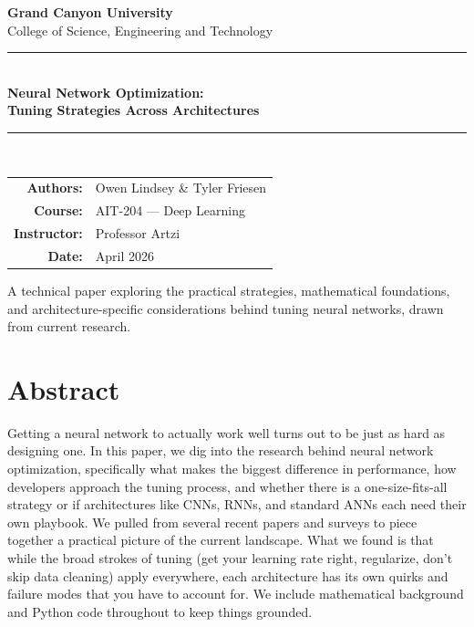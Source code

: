 \documentclass[12pt, letterpaper]{article}
\begin{document}
\begin{titlepage}
\centering
\vspace*{2cm}

{\Large\bfseries\color{gcupurple} Grand Canyon University}\\[4pt]
{\large College of Science, Engineering and Technology}\\[1cm]
\rule{\textwidth}{1.2pt}\\[1.4cm]

{\LARGE\bfseries Neural Network Optimization:\\[6pt]
Tuning Strategies Across Architectures}\\[1.4cm]

\rule{\textwidth}{1.2pt}\\[2cm]

{\large
\begin{tabular}{rl}
\textbf{Authors:} & Owen Lindsey \& Tyler Friesen \\[6pt]
\textbf{Course:} & AIT-204 --- Deep Learning \\[6pt]
\textbf{Instructor:} & Professor Artzi \\[6pt]
\textbf{Date:} & April 2026 \\
\end{tabular}
}

\vfill
{\small A technical paper exploring the practical strategies, mathematical foundations, and architecture-specific considerations behind tuning neural networks, drawn from current research.}
\end{titlepage}

\section*{Abstract}

Getting a neural network to actually work well turns out to be just as hard as designing one. In this paper, we dig into the research behind neural network optimization, specifically what makes the biggest difference in performance, how developers approach the tuning process, and whether there is a one-size-fits-all strategy or if architectures like CNNs, RNNs, and standard ANNs each need their own playbook. We pulled from several recent papers and surveys to piece together a practical picture of the current landscape. What we found is that while the broad strokes of tuning (get your learning rate right, regularize, don't skip data cleaning) apply everywhere, each architecture has its own quirks and failure modes that you have to account for. We include mathematical background and Python code throughout to keep things grounded.
\end{document}
